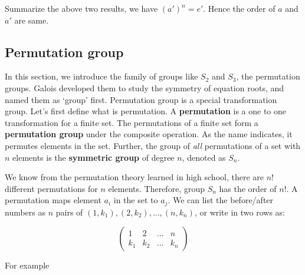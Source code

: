 \documentclass[b5paper]{article}
\begin{document}
\begin{Answer}[ref={ex:group-rules}]
{Summarize the above two results, we have $(a')^n = e'$. Hence the order of $a$ and $a'$ are same.
}
\end{Answer}

\subsection{Permutation group}
\label{permutation group}
\label{symmetric group}
 

In this section, we introduce the family of groups like $S_2$ and $S_3$, the permutation groups. Galois developed them to study the symmetry of equation roots, and named them as `group' first. Permutation group is a special transformation group. Let's first define what is permutation. A \textbf{permutation} is a one to one transformation for a finite set. The permutations of a finite set form a \textbf{permutation group} under the composite operation. As the name indicates, it permutes elements in the set. Further, the group of {\em all} permutations of a set with $n$ elements is the \textbf{symmetric group} of degree $n$, denoted as $S_n$.

We know from the permutation theory learned in high school, there are $n!$ different permutations for $n$ elements. Therefore, group $S_n$ has the order of $n!$. A permutation maps element $a_i$ in the set to $a_j$. We can list the before/after numbers as $n$ pairs of $(1, k_1), (2, k_2), ..., (n, k_n)$, or write in two rows as:

\[
\begin{pmatrix}
1 & 2 & ... & n \\
k_1 & k_2 & ... & k_n
\end{pmatrix}
\]

For example
\end{document}
